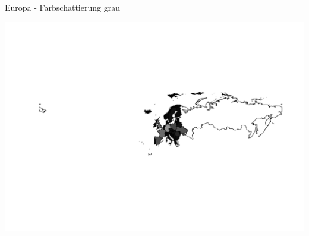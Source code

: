 \documentclass[ignorenonframetext,]{beamer}
\newenvironment{Shaded}{\begin{snugshade}}{\end{snugshade}}
\newcommand{\DataTypeTok}[1]{\textcolor[rgb]{0.74,0.68,0.62}{\underline{#1}}}
\newcommand{\KeywordTok}[1]{\textcolor[rgb]{0.26,0.66,0.93}{\textbf{#1}}}
\newcommand{\NormalTok}[1]{\textcolor[rgb]{0.74,0.68,0.62}{#1}}
\newcommand{\OperatorTok}[1]{\textcolor[rgb]{0.74,0.68,0.62}{#1}}
\newcommand{\StringTok}[1]{\textcolor[rgb]{0.02,0.61,0.04}{#1}}
\begin{document}
\begin{frame}[fragile]{Europa - Farbschattierung grau}
\protect\hypertarget{europa---farbschattierung-grau}{}

\begin{Shaded}
\end{Shaded}

\includegraphics{Geomedizin_files/figure-beamer/unnamed-chunk-82-1.pdf}

\end{frame}
\end{document}
